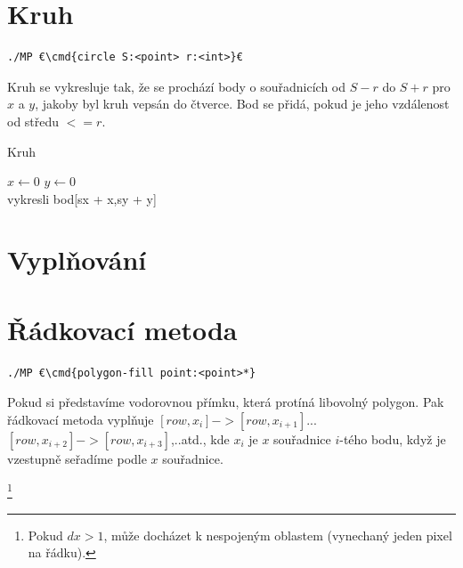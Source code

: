 \documentclass[a4paper,12pt]{report}
\newcommand{\cmd}[1]{\textcolor{blue}{\textbf{#1}}}
\begin{document}
\section{Kruh}
\begin{lstlisting}
./MP €\cmd{circle S:<point> r:<int>}€
\end{lstlisting}
Kruh se vykresluje tak, že se prochází body o souřadnicích od $S-r$ do $S+r$ pro $x$ a $y$, jakoby byl kruh vepsán do čtverce. Bod se přidá, pokud je jeho vzdálenost od středu $<=r$.

\begin{algorithm}[H]
\caption{Kruh}
\begin{algorithmic}[1]
\State $x \gets 0$
\State $y \gets 0$
\\vykresli bod[sx + x,sy + y]
\EndIf
\EndFor
\EndFor
\end{algorithmic}
\end{algorithm}



\section{Vyplňování} %

\section{Řádkovací metoda}

\begin{lstlisting}
./MP €\cmd{polygon-fill point:<point>*}
\end{lstlisting}

Pokud si představíme vodorovnou přímku, která protíná libovolný polygon. Pak řádkovací metoda vyplňuje $[row,x_{i}]->[row,x_{i+1}]$...$[row,x_{i+2}]->[row,x_{i+3}]$,..atd., kde $x_i$ je $x$ souřadnice $i$-tého bodu, když je vzestupně seřadíme podle $x$ souřadnice.

\footnote{Pokud $dx>1$, může docházet k nespojeným oblastem (vynechaný jeden pixel na řádku).}
\end{document}
